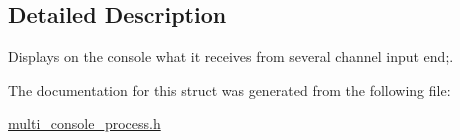 \subsection{Detailed Description}
Displays on the console what it receives from several channel input end;. 

The documentation for this struct was generated from the following file\-:\begin{DoxyCompactItemize}
\item 
\hyperlink{multi__console__process_8h}{multi\-\_\-console\-\_\-process.\-h}\end{DoxyCompactItemize}
